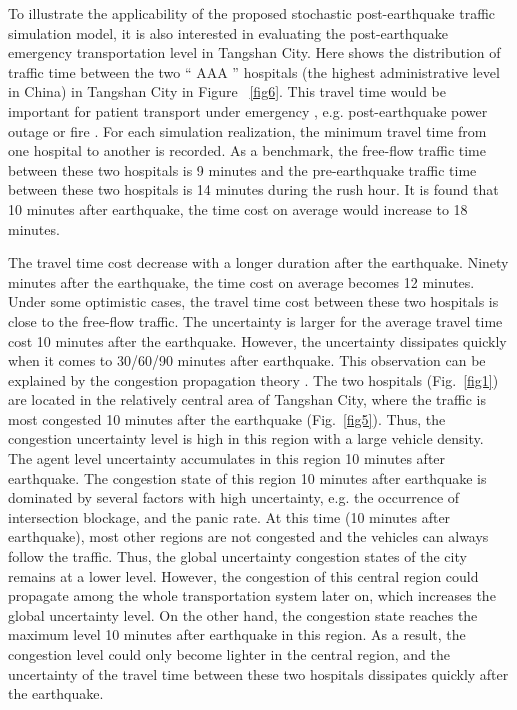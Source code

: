 \documentclass[review,11pt,nonatbib]{elsarticle}
\begin{document}
To illustrate the applicability of the proposed stochastic post-earthquake traffic simulation model, it is also interested in evaluating the post-earthquake emergency transportation level in Tangshan City. Here shows the distribution of traffic time between the two `` AAA '' hospitals (the highest administrative level in China) in Tangshan City in Figure ~\ref{fig6}. This travel time would be important for patient transport under emergency \citep{ceferino2020effective}, e.g. post-earthquake power outage or fire . For each simulation realization, the minimum travel time from one hospital to another is recorded. As a benchmark, the free-flow traffic time between these two hospitals is 9 minutes and the pre-earthquake traffic time between these two hospitals is 14 minutes during the rush hour. It is found that 10 minutes after earthquake, the time cost on average would increase to 18 minutes. 

The travel time cost decrease with a longer duration after the earthquake. Ninety minutes after the earthquake, the time cost on average becomes 12 minutes. Under some optimistic cases, the travel time cost between these two hospitals is close to the free-flow traffic. The uncertainty is larger for the average travel time cost 10 minutes after the earthquake. However, the uncertainty dissipates quickly when it comes to 30/60/90 minutes after earthquake. This observation can be explained by the congestion propagation theory \citep{zhao2016spatio}. The two hospitals (Fig.~\ref{fig1}) are located in the relatively central area of Tangshan City, where the traffic is most congested 10 minutes after the earthquake (Fig.~\ref{fig5}). Thus, the congestion uncertainty level is high in this region with a large vehicle density. The agent level uncertainty accumulates in this region 10 minutes after earthquake. The congestion state of this region 10 minutes after earthquake is dominated by several factors with high uncertainty, e.g. the occurrence of intersection blockage, and the panic rate. At this time (10 minutes after earthquake), most other regions are not congested and the vehicles can always follow the traffic. Thus, the global uncertainty congestion states of the city remains at a lower level. However, the congestion of this central region could propagate among the whole transportation system later on, which increases the global uncertainty level. On the other hand, the congestion state reaches the maximum level 10 minutes after earthquake in this region. As a result, the congestion level could only become lighter in the central region, and the uncertainty of the travel time between these two hospitals dissipates quickly after the earthquake.
\end{document}
